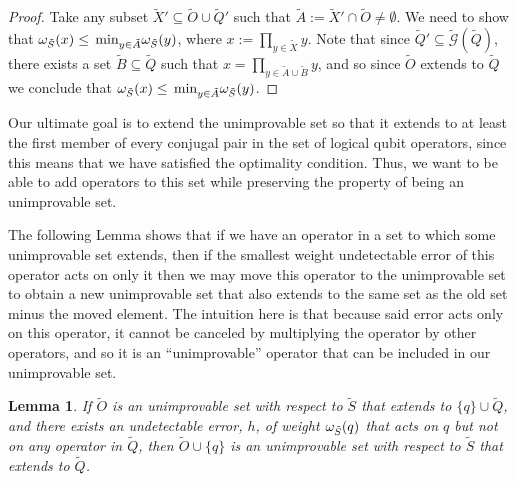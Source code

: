 \documentclass[twocolumn,showpacs,preprintnumbers,amsmath,amssymb,nofootinbib,pra,floatfix]{revtex4-1}
\newtheorem{lemma}{Lemma}
\newenvironment{remark}[1][Remark]{\begin{trivlist}
\item[\hskip \labelsep {\bfseries #1}]}{\end{trivlist}}
\newcommand{\set}{\tilde}
\newcommand{\genfun}{\tilde{\mathcal{G}}}
\begin{document}
\begin{proof}
Take any subset $\set X' \subseteq \set O\cup\set Q'$ such that $\set A := \set X'\cap \set O \ne \emptyset$.  We need to show that $\om_{\set S}(x)\le\min_{y\in\set A}\om_{\set S}(y)$, where $x := \prod_{y\in\set X} y$.  Note that since $\set Q'\subseteq\genfun(\set Q)$, there exists a set $\set B\subseteq \set Q$ such that $x = \prod_{y\in\set A\cup\set B} y$, and so since $\set O$ extends to $\set Q$ we conclude that $\om_{\set S}(x)\le\min_{y\in\set A}\om_{\set S}(y)$.
\end{proof}
\begin{remark}
Our ultimate goal is to extend the unimprovable set so that it extends to at least the first member of every conjugal pair in the set of logical qubit operators, since this means that we have satisfied the optimality condition.  Thus, we want to be able to add operators to this set while preserving the property of being an unimprovable set.

The following Lemma shows that if we have an operator in a set to which some unimprovable set extends, then if the smallest weight undetectable error of this operator acts on only it then we may move this operator to the unimprovable set to obtain a new unimprovable set that also extends to the same set as the old set minus the moved element.  The intuition here is that because said error acts only on this operator, it cannot be canceled by multiplying the operator by other operators, and so it is an ``unimprovable'' operator that can be included in our unimprovable set.
\end{remark}

\begin{lemma}
\label{move-it-over}
If $\set O$ is an unimprovable set with respect to $\set S$ that extends to $\{q\}\cup\set Q$, and there exists an undetectable error, $h$, of weight $\om_{\set S}(q)$ that acts on $q$ but not on any operator in $\set Q$, then $\set O\cup\{q\}$ is an unimprovable set with respect to $\set S$ that extends to $\set Q$.
\end{lemma}
\end{document}
